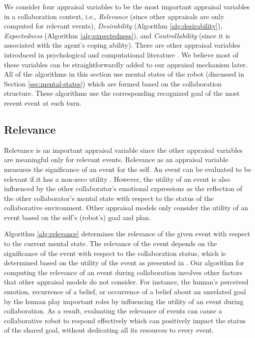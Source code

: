 We consider four appraisal variables to be the most important appraisal
variables in a collaboration context, i.e., \textit{Relevance} (since other
appraisals are only computed for relevant events), \textit{Desirability}
(Algorithm \ref{alg:desirability}), \textit{Expectedness} (Algorithm
\ref{alg:expectedness}), and \textit{Controllability} (since it is associated
with the agent's coping ability). There are other appraisal variables introduced
in psychological \cite{scherer:appraisal-processes} and computational literature
\cite{gratch:domain-independent}. We believe most of these variables can be
straightforwardly added to our appraisal mechanism later. All of the algorithms
in this section use mental states of the robot (discussed in Section
\ref{sec:mental-states}) which are formed based on the collaboration structure.
These algorithms use the corresponding recognized goal of the most recent event
at each turn.

\subsection{Relevance}

Relevance is an important appraisal variable since the other appraisal variables
are meaningful only for relevant events. Relevance as an appraisal variable
measures the significance of an event for the self. An event can be evaluated to
be relevant if it has a non-zero utility \cite{marsella:ema-process-model}.
However, the utility of an event is also influenced by the other collaborator's
emotional expressions as the reflection of the other collaborator's mental state
with respect to the status of the collaborative environment. Other appraisal
models only consider the utility of an event based on the self's (robot's) goal
and plan.

Algorithm \ref{alg:relevance} determines the relevance of the given event with
respect to the current mental state. The relevance of the event depends on the
significance of the event with respect to the collaboration status, which is
determined based on the utility of the event as presented in
\cite{gratch:domain-independent,marsella:ema-process-model}. Our algorithm for
computing the relevance of an event during collaboration involves other factors
that other appraisal models do not consider. For instance, the human's
perceived emotion, recurrence of a belief, or occurrence of a belief about an
unrelated goal by the human play important roles by influencing the utility
of an event during collaboration. As a result, evaluating the relevance of
events can cause a collaborative robot to respond effectively which can
positively impact the status of the shared goal, without dedicating all its
resources to every event.

